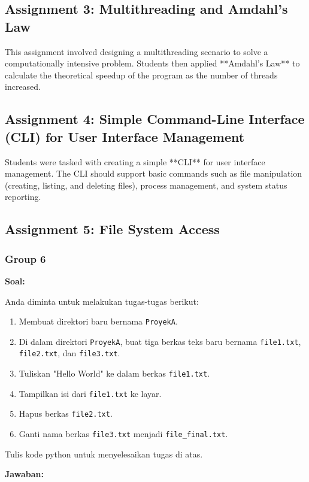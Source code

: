 \documentclass[12pt]{article}
\begin{document}
\subsection{Assignment 3: Multithreading and Amdahl's Law}
This assignment involved designing a multithreading scenario to solve a computationally intensive problem. Students then applied **Amdahl's Law** to calculate the theoretical speedup of the program as the number of threads increased.

\subsection{Assignment 4: Simple Command-Line Interface (CLI) for User Interface Management}
Students were tasked with creating a simple **CLI** for user interface management. The CLI should support basic commands such as file manipulation (creating, listing, and deleting files), process management, and system status reporting.

\subsection{Assignment 5: File System Access}
\subsubsection{Group 6}
\textbf{Soal:}

Anda diminta untuk melakukan tugas-tugas berikut:

\begin{enumerate}
    \item Membuat direktori baru bernama \texttt{ProyekA}.
    \item Di dalam direktori \texttt{ProyekA}, buat tiga berkas teks baru bernama \texttt{file1.txt}, \texttt{file2.txt}, dan \texttt{file3.txt}.
    \item Tuliskan "Hello World" ke dalam berkas \texttt{file1.txt}.
    \item Tampilkan isi dari \texttt{file1.txt} ke layar.
    \item Hapus berkas \texttt{file2.txt}.
    \item Ganti nama berkas \texttt{file3.txt} menjadi \texttt{file\_final.txt}.
\end{enumerate}

Tulis kode python untuk menyelesaikan tugas di atas.

\textbf{Jawaban:}
\end{document}
